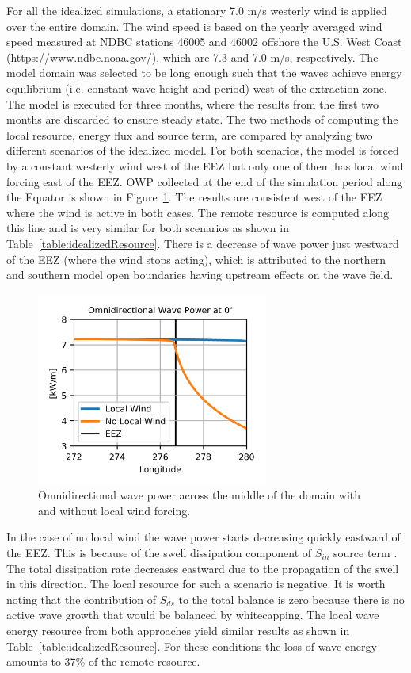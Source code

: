 For all the idealized simulations, a stationary 7.0 m/s westerly wind is applied over the entire domain. The wind speed is based on the yearly averaged wind speed measured at NDBC stations 46005 and 46002 offshore the U.S. West Coast (\url{https://www.ndbc.noaa.gov/}), which are 7.3 and 7.0 m/s, respectively. The model domain was selected to be long enough such that the waves achieve energy equilibrium (i.e. constant wave height and period) west of the extraction zone. The model is executed for three months, where the results from the first two months are discarded to ensure steady state. The two methods of computing the local resource, energy flux and source term, are compared by analyzing two different scenarios of the idealized model. For both scenarios, the model is forced by a constant westerly wind west of the EEZ but only one of them has local wind forcing east of the EEZ. OWP collected at the end of the simulation period along the Equator is shown in Figure~\ref{fig:idealizedOWP}. The results are consistent west of the EEZ where the wind is active in both cases. The remote resource is computed along this line and is very similar for both scenarios as shown in Table~\ref{table:idealizedResource}. There is a decrease of wave power just westward of the EEZ (where the wind stops acting), which is attributed to the northern and southern model open boundaries having upstream effects on the wave field.

\begin{figure}[ht]
  \centering
  \includegraphics[width=3in]{../diagram/appendixB_Figure2.png}
  \caption{Omnidirectional wave power across the middle of the domain with and without local wind forcing.}
  \label{fig:idealizedOWP}
\end{figure}

In the case of no local wind the wave power starts decreasing quickly eastward of the EEZ. This is because of the swell dissipation component of $S_{in}$ source term \citep{ardhuinObservationSwellDissipation2009}. The total dissipation rate decreases eastward due to the propagation of the swell in this direction. The local resource for such a scenario is negative. It is worth noting that the contribution of $S_{ds}$ to the total balance is zero because there is no active wave growth that would be balanced by whitecapping. The local wave energy resource from both approaches yield similar results as shown in Table~\ref{table:idealizedResource}. For these conditions the loss of wave energy amounts to 37\% of the remote resource. 

